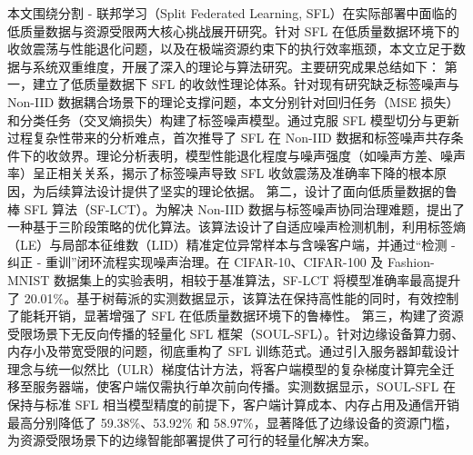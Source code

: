 本文围绕分割 - 联邦学习（Split Federated Learning, SFL）在实际部署中面临的低质量数据与资源受限两大核心挑战展开研究。针对 SFL 在低质量数据环境下的收敛震荡与性能退化问题，以及在极端资源约束下的执行效率瓶颈，本文立足于数据与系统双重维度，开展了深入的理论与算法研究。主要研究成果总结如下：
第一，建立了低质量数据下 SFL 的收敛性理论体系。针对现有研究缺乏标签噪声与 Non-IID 数据耦合场景下的理论支撑问题，本文分别针对回归任务（MSE 损失）和分类任务（交叉熵损失）构建了标签噪声模型。通过克服 SFL 模型切分与更新过程复杂性带来的分析难点，首次推导了 SFL 在 Non-IID 数据和标签噪声共存条件下的收敛界。理论分析表明，模型性能退化程度与噪声强度（如噪声方差、噪声率）呈正相关关系，揭示了标签噪声导致 SFL 收敛震荡及准确率下降的根本原因，为后续算法设计提供了坚实的理论依据。
第二，设计了面向低质量数据的鲁棒 SFL 算法（SF-LCT）。为解决 Non-IID 数据与标签噪声协同治理难题，提出了一种基于三阶段策略的优化算法。该算法设计了自适应噪声检测机制，利用标签熵（LE）与局部本征维数（LID）精准定位异常样本与含噪客户端，并通过“检测 - 纠正 - 重训”闭环流程实现噪声治理。在 CIFAR-10、CIFAR-100 及 Fashion-MNIST 数据集上的实验表明，相较于基准算法，SF-LCT 将模型准确率最高提升了 20.01\%。基于树莓派的实测数据显示，该算法在保持高性能的同时，有效控制了能耗开销，显著增强了 SFL 在低质量数据环境下的鲁棒性。
第三，构建了资源受限场景下无反向传播的轻量化 SFL 框架（SOUL-SFL）。针对边缘设备算力弱、内存小及带宽受限的问题，彻底重构了 SFL 训练范式。通过引入服务器卸载设计理念与统一似然比（ULR）梯度估计方法，将客户端模型的复杂梯度计算完全迁移至服务器端，使客户端仅需执行单次前向传播。实测数据显示，SOUL-SFL 在保持与标准 SFL 相当模型精度的前提下，客户端计算成本、内存占用及通信开销最高分别降低了 59.38\%、53.92\% 和 58.97\%，显著降低了边缘设备的资源门槛，为资源受限场景下的边缘智能部署提供了可行的轻量化解决方案。
